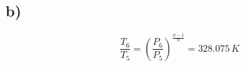 

\subsection*{b)}

\[
\frac{T_6}{T_5} = \left( \frac{P_6}{P_5} \right)^{\frac{n-1}{n}} = 328.075 \, K
\]